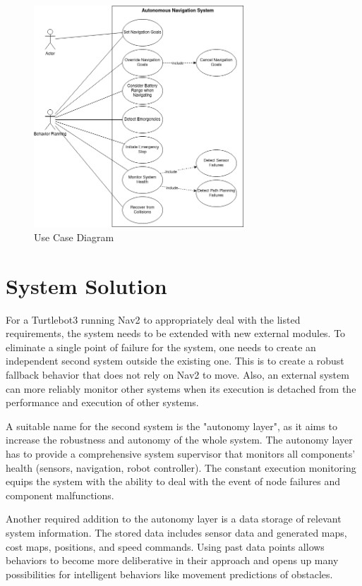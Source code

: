 \begin{figure}[ht]
	\centering
	\includegraphics[width=0.7\textwidth]{images/use_case.png}
	\caption{Use Case Diagram}
	\label{fig:use_case}
\end{figure}


\section{System Solution}
\label{sec:System Solution}

For a Turtlebot3 running Nav2 to appropriately deal with the listed requirements, the system needs to be extended with new external modules. To eliminate a single point of failure for the system, one needs to create an independent second system outside the existing one. This is to create a robust fallback behavior that does not rely on Nav2 to move. Also, an external system can more reliably monitor other systems when its execution is detached from the performance and execution of other systems.

A suitable name for the second system is the "autonomy layer", as it aims to increase the robustness and autonomy of the whole system. The autonomy layer has to provide a comprehensive system supervisor that monitors all components' health (sensors, navigation, robot controller). The constant execution monitoring equips the system with the ability to deal with the event of node failures and component malfunctions.

Another required addition to the autonomy layer is a data storage of relevant system information. The stored data includes sensor data and generated maps, cost maps, positions, and speed commands. Using past data points allows behaviors to become more deliberative in their approach and opens up many possibilities for intelligent behaviors like movement predictions of obstacles. 

